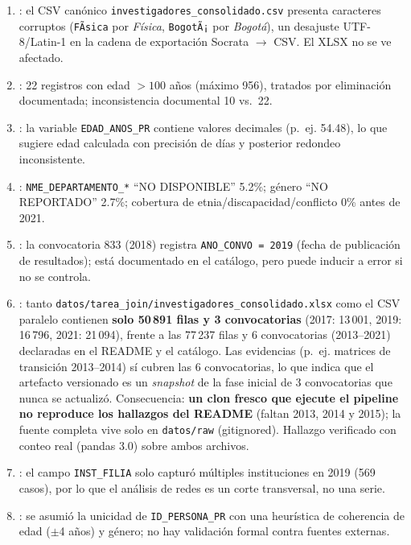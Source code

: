 \begin{enumerate}
  \item {}: el CSV canónico
        \texttt{investigadores\_consolidado.csv} presenta caracteres corruptos
        (\texttt{FÃ­sica} por \emph{Física}, \texttt{BogotÃ¡} por \emph{Bogotá}),
        un desajuste UTF-8/Latin-1 en la cadena de exportación Socrata $\rightarrow$
        CSV. El XLSX no se ve afectado.
  \item {}: 22 registros con edad $>100$ años (máximo 956),
        tratados por eliminación documentada; inconsistencia documental 10 vs.\ 22.
  \item {}: la variable \texttt{EDAD\_ANOS\_PR} contiene
        valores decimales (p.~ej. 54.48), lo que sugiere edad calculada con
        precisión de días y posterior redondeo inconsistente.
  \item {}: \texttt{NME\_DEPARTAMENTO\_*}
        ``NO DISPONIBLE'' 5.2\%; género ``NO REPORTADO'' 2.7\%; cobertura de
        etnia/discapacidad/conflicto 0\% antes de 2021.
  \item {}: la convocatoria 833 (2018) registra
        \texttt{ANO\_CONVO = 2019} (fecha de publicación de resultados); está
        documentado en el catálogo, pero puede inducir a error si no se controla.
  \item {}: tanto
        \texttt{datos/tarea\_join/investigadores\_consolidado.xlsx} como el CSV
        paralelo contienen \textbf{solo 50\,891 filas y 3 convocatorias}
        (2017: 13\,001, 2019: 16\,796, 2021: 21\,094), frente a las 77\,237 filas
        y 6 convocatorias (2013--2021) declaradas en el README y el catálogo.
        Las evidencias (p.~ej. matrices de transición 2013--2014) sí cubren las
        6 convocatorias, lo que indica que el artefacto versionado es un
        \emph{snapshot} de la fase inicial de 3 convocatorias que nunca se
        actualizó. Consecuencia: \textbf{un clon fresco que ejecute el pipeline
        no reproduce los hallazgos del README} (faltan 2013, 2014 y 2015);
        la fuente completa vive solo en \texttt{datos/raw} (gitignored).
        Hallazgo verificado con conteo real (pandas 3.0) sobre ambos archivos.
  \item {}: el campo \texttt{INST\_FILIA}
        solo capturó múltiples instituciones en 2019 (569 casos), por lo que el
        análisis de redes es un corte transversal, no una serie.
  \item {}: se asumió la unicidad de \texttt{ID\_PERSONA\_PR}
        con una heurística de coherencia de edad ($\pm$4 años) y género; no hay
        validación formal contra fuentes externas.
\end{enumerate}

